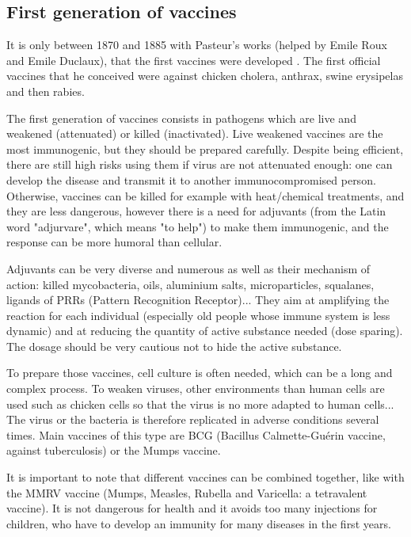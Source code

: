 \documentclass{article}
\begin{document}
        \subsection{First generation of vaccines}
            
            It is only between 1870 and 1885 with Pasteur's works (helped by Emile Roux and Emile Duclaux), 
                that the first vaccines were developed \autocite{plotkinHistoryVaccination2014}.
            The first official vaccines that he conceived were against chicken cholera, anthrax, swine erysipelas and then rabies.

            The first generation of vaccines consists in pathogens which are live and weakened (attenuated) or killed (inactivated). Live weakened vaccines are the most immunogenic,
                but they should be prepared carefully. Despite being efficient, there are still high risks using them if virus are not attenuated enough:
                one can develop the disease and transmit it to another immunocompromised person. Otherwise, vaccines can be killed for example with heat/chemical treatments, and they
                are less dangerous, however there is a need for adjuvants (from the Latin word "adjurvare", which means "to help") 
                to make them immunogenic, and the response can be more humoral than cellular.

            Adjuvants can be very diverse and numerous as well as their mechanism of action: killed mycobacteria, oils, 
                aluminium salts, microparticles, squalanes, ligands of 
                PRRs (Pattern Recognition Receptor)... 
                They aim at amplifying the reaction for each individual (especially old people whose immune system is less dynamic) and 
                at reducing the quantity of active substance needed (dose sparing). The dosage should be very cautious not to hide the active substance.
                
            To prepare those vaccines, cell culture is often needed, which can be a long and complex process.
            To weaken viruses, other environments than human cells are used such as chicken cells so that the virus is no more adapted to human cells...
            The virus or the bacteria is therefore replicated in adverse conditions several times. Main vaccines of this type are BCG
            (Bacillus Calmette-Guérin vaccine, against tuberculosis) or the Mumps vaccine. 

            It is important to note that different vaccines can be combined together,
            like with the MMRV vaccine (Mumps, Measles, Rubella and Varicella: a tetravalent vaccine).
            It is not dangerous for health and it avoids too many injections for children,
            who have to develop an immunity for many diseases in the first years.
            
\end{document}
